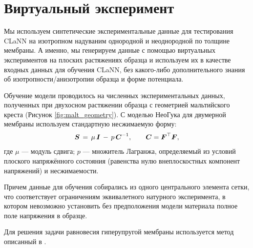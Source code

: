 \section{Виртуальный эксперимент}

Мы используем синтетические экспериментальные данные для тестирования CLaNN 
на изотропном надуваним однородной и неоднородной по толщине мембраны. 
А именно, мы генерируем данные с помощью виртуальных экспериментов на плоских растяжениях образца и используем их в качестве входных данных для 
обучения CLaNN, без какого-либо дополнительного знания об изотропности/анизотропии образца и форме потенциала.
 
Обучение модели проводилось на численных экспериментальных данных, 
полученных при двухосном растяжении образца с геометрией мальтийского креста (Рисунок \ref{fig:malt_geometry}).
С моделью Нео\textendash Гука для двумерной мембраны \cite{ogden1997nonlinear} 
используем стандартную несжимаемую форму:
\begin{equation}
  \boldsymbol{S} \,=\, \mu\,\boldsymbol{I} \,-\, p\,\boldsymbol{C}^{-1},
  \qquad \boldsymbol{C} = \boldsymbol{F}^{\top}\boldsymbol{F},
  \label{eq:neo_hooke_membrane_S}
\end{equation}
где $\mu$ — модуль сдвига; $p$ — множитель Лагранжа, определяемый из условий плоского
напряжённого состояния (равенства нулю внеплоскостных компонент напряжений) и несжимаемости.


Причем данные для обучения собирались из одного центрального элемента сетки, что соответствует ограничениям эквивалетного 
натурного эксперимента, в котором невозможно установить без предположения модели материала полное поле напряжения в образце.

Для решения задачи равновесия гиперупругой мембраны используется метод описанный в \cite{ddaniso2024}.

